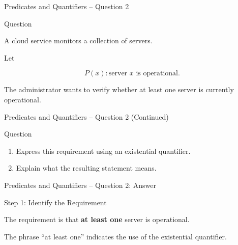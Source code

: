 
\begin{frame}{Predicates and Quantifiers -- Question 2}

\begin{block}{Question}

A cloud service monitors a collection of servers.

Let

$$
P(x):\text{server $x$ is operational}.
$$

The administrator wants to verify whether at least one server is
currently operational.

\end{block}

\end{frame}

\begin{frame}{Predicates and Quantifiers -- Question 2 (Continued)}

\begin{block}{Question}

\begin{enumerate}
\item Express this requirement using an existential quantifier.
\item Explain what the resulting statement means.
\end{enumerate}

\end{block}

\end{frame}


\begin{frame}{Predicates and Quantifiers -- Question 2: Answer}

\begin{exampleblock}{Step 1: Identify the Requirement}

The requirement is that \textbf{at least one} server is operational.

The phrase ``at least one'' indicates the use of the existential
quantifier.

\end{exampleblock}

\end{frame}

